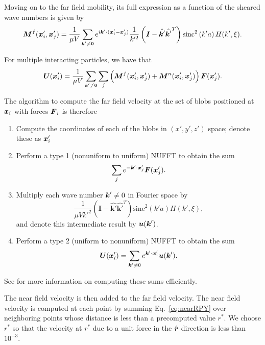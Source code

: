 Moving on to the far field mobility, its full expression as a function of the sheared wave numbers is given by
\begin{equation}
\boldsymbol{M}^f (\boldsymbol{x}_i',\boldsymbol{x}_j')=\frac{1}{\mu V}\sum_{\small{\boldsymbol{k}'\neq \boldsymbol{0}}}  e^{i\boldsymbol{k}' \cdot (\boldsymbol{x}'_i-\boldsymbol{x}'_j)} \frac{1}{k'^2}\left(\boldsymbol{I}-\hat{\boldsymbol{k}'}\hat{\boldsymbol{k}'}^T\right)\text{sinc}^2\left(k'a\right)H(k',\xi). 
\end{equation}

For multiple interacting particles, we have that 
\begin{equation}
\boldsymbol{U}(\boldsymbol{x}'_i) = \frac{1}{\mu V}\sum_{\small{\boldsymbol{k}'\neq \boldsymbol{0}}} \sum_j \left(\boldsymbol{M}^{f}(\boldsymbol{x}_i',\boldsymbol{x}_j')+\boldsymbol{M}^{n}(\boldsymbol{x}_i',\boldsymbol{x}_j')\right)\boldsymbol{F}(\boldsymbol{x}'_j). 
\end{equation} 

The algorithm to compute the far field velocity at the set of blobs positioned at $\boldsymbol{x}_i$ with forces $\boldsymbol{F}_i$ is therefore
\begin{enumerate}
\item Compute the coordinates of each of the blobs in $(x',y',z')$ space; denote these as $\boldsymbol{x}'_i$
\item Perform a type 1 (nonuniform to uniform) NUFFT to obtain the sum
\begin{equation}
\sum_j e^{-\boldsymbol{k}' \cdot \boldsymbol{x}'_j} \boldsymbol{F}(\boldsymbol{x}'_j).
\end{equation}
\item Multiply each wave number $\boldsymbol{k}' \neq 0$ in Fourier space by 
\begin{equation}
\frac{1}{\mu V k'^2}\left(\bm{I}-\hat{\bm{k}'}\hat{\bm{k}'}^T\right)\text{sinc}^2\left(k'a\right)H(k',\xi), 
\end{equation}
and denote this intermediate result by $\boldsymbol{u}(\boldsymbol{k}')$. 
\item Perform a type 2 (uniform to nonuniform) NUFFT to obtain the sum 
\begin{equation}
\boldsymbol{U}(\boldsymbol{x}_i') = \sum_{\boldsymbol{k}' \neq 0} e^{\boldsymbol{k}' \cdot \boldsymbol{x}'_i} \boldsymbol{u}(\boldsymbol{k}').
\end{equation}
\end{enumerate}
See \cite{barnettES} for more information on computing these sums efficiently. 

The near field velocity is then added to the far field velocity. The near field velocity is computed at each point by summing Eq.\ \eqref{eq:nearRPY} over neighboring points whose distance is less than a precomputed value $r^*$. We choose $r^*$ so that the velocity at $r^*$ due to a unit force in the $\hat{\boldsymbol{r}}$ direction is less than $10^{-3}$. 

